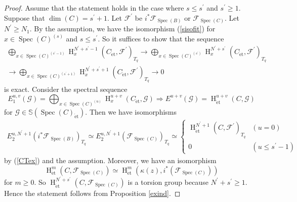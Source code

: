 \documentclass{article}
\newcommand{\spec}{\operatorname{Spec}}
\newcommand{\et}{\mathrm{\acute{e}t}}
\newcommand{\HO}{\operatorname{H}}
\begin{document}
\begin{proof}
Assume that the statement holds in the case where $s\leq s^{\prime}$ and $s^{\prime}\geq 1$. 
Suppose that
$\operatorname{dim}(C)=s^{\prime}+1$.
Let $\mathcal{F}^{\prime}$ be
$i^{*}\mathcal{F}_{\spec(B)}$ or
$\mathcal{F}_{\spec(C)}$. Let $N^{\prime}\geq N_{1}$.
By the assumption, we have the isomorphism (\ref{sisofit})
for $x\in \spec(C)^{(s)}$ and $s\leq s^{\prime}$.
%
So it suffices to show that
the sequence
%
\begin{align*}
\bigoplus_{x\in\spec(C)^{(s^{\prime}-1)}}
\HO^{N^{\prime}+s^{\prime}-1}_{x}
(C_{\et}, \mathcal{F}^{\prime})_{T_{q}}
\to
\bigoplus_{x\in\spec(C)^{(s^{\prime})}}
\HO^{N^{\prime}+s^{\prime}}_{x}
(C_{\et}, \mathcal{F}^{\prime})_{T_{q}}
\\
\to
\bigoplus_{x\in\spec(C)^{(s^{\prime}+1)}}
\HO^{N^{\prime}+s^{\prime}+1}_{x}
(C_{\et}, \mathcal{F}^{\prime})_{T_{q}}
\to 0
\end{align*}
%
is exact.
Consider the spectral sequence
%
\begin{equation*}
E^{u, v}_{1}(\mathcal{G})
=
\bigoplus_{x\in \spec(C)^{(u)}}
\HO^{u+v}_{x}(C_{\et}, \mathcal{G})
\Rightarrow
E^{u+v}(\mathcal{G})
=
\HO^{u+v}_{\et}
(C, \mathcal{G})
\end{equation*}
%
for $\mathcal{G}\in\mathbb{S}(\spec(C)_{\et})$.
Then we have isomorphisms
%
\begin{align}\label{casevani}
E^{u, N^{\prime}+1}_{2}(i^{*}\mathcal{F}_{\spec(B)})_{T_{q}}
\simeq 
E^{u, N^{\prime}+1}_{2}(\mathcal{F}_{\spec(C)})_{T_{q}}
\simeq 
\left\{
%
\begin{array}{ll}
\HO^{N^{\prime}+1}_{\et}(
C,
\mathcal{F}^{\prime}
)_{T_{q}} 
& (u=0)
\\ [5pt]
0 & (u\leq  s^{\prime}-1)
\end{array}
%
\right.
%
\end{align}
%
by (\ref{CTex}) and the assumption. 
Moreover, we have an isomorphism
%
\begin{equation*}
\HO^{m}_{\et}(C, \mathcal{F}_{\spec(C)})
\simeq 
\HO^{m}_{\et}(\kappa(z),
i^{*}(\mathcal{F}_{\spec(C)})
)
\end{equation*}
%
for $m\geq 0$. 
So 
$\HO_{\et}^{N^{\prime}+s^{\prime}}(C, \mathcal{F}_{\spec(C)})$
is a torsion group
because
$N^{\prime}+s^{\prime}\geq 1$.
Hence the statement follows from Proposition \ref{exind}.
\end{proof}
%
\end{document}
